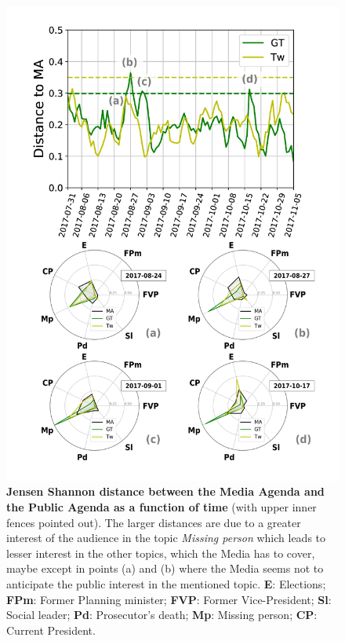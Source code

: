 \documentclass{bmcart}
\begin{document}
\begin{backmatter}
\begin{figure}[h!]
\includegraphics[height = 0.7\textheight]{Fig4.pdf}
\caption{\textbf{Jensen Shannon distance between the Media Agenda and the Public Agenda as a function of time} (with upper inner fences pointed out). The larger distances are due to a greater interest of the audience in the topic \emph{Missing person} which leads to lesser interest in the other topics, which the Media has to cover, maybe except in points (a) and (b) where the Media seems not to anticipate the public interest in the mentioned topic. \textbf{E}: Elections; \textbf{FPm}: Former Planning minister; \textbf{FVP}: Former Vice-President; \textbf{Sl}: Social leader; \textbf{Pd}: Prosecutor's death; \textbf{Mp}: Missing person; \textbf{CP}: Current President.}
\label{fig:jensen_shannon_gt}
\end{figure}


\end{backmatter}
\end{document}

